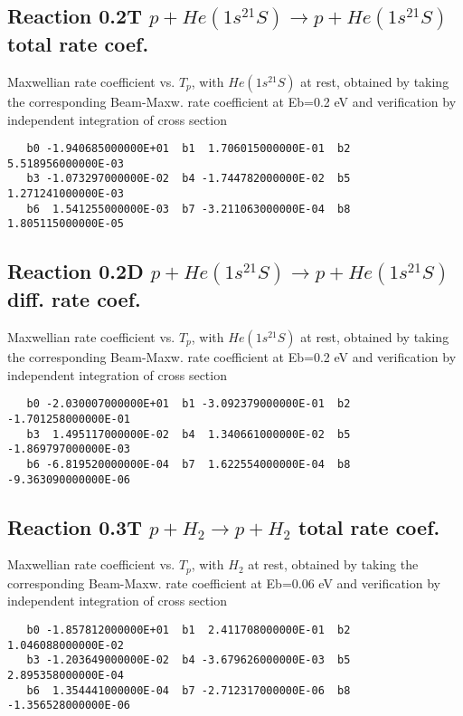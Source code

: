 \documentclass[12pt,dvipdfmx]{article}
\begin{document}
\subsection{
Reaction 0.2T  $p + He(1s^21S) \rightarrow p + He(1s^21S)$ total rate coef.
}
Maxwellian rate coefficient vs. $T_p$, with $He(1s^21S)$ at rest, obtained by taking
the corresponding Beam-Maxw. rate coefficient at Eb=0.2 eV and
verification by independent integration of cross section
\begin{small}\begin{verbatim}
   b0 -1.940685000000E+01  b1  1.706015000000E-01  b2  5.518956000000E-03
   b3 -1.073297000000E-02  b4 -1.744782000000E-02  b5  1.271241000000E-03
   b6  1.541255000000E-03  b7 -3.211063000000E-04  b8  1.805115000000E-05
\end{verbatim}\end{small}


\subsection{
Reaction 0.2D  $p + He(1s^21S) \rightarrow p + He(1s^21S)$ diff. rate coef.
}
Maxwellian rate coefficient vs. $T_p$, with $He(1s^21S)$ at rest, obtained by taking
the corresponding Beam-Maxw. rate coefficient at Eb=0.2 eV and
verification by independent integration of cross section
\begin{small}\begin{verbatim}
   b0 -2.030007000000E+01  b1 -3.092379000000E-01  b2 -1.701258000000E-01
   b3  1.495117000000E-02  b4  1.340661000000E-02  b5 -1.869797000000E-03
   b6 -6.819520000000E-04  b7  1.622554000000E-04  b8 -9.363090000000E-06
\end{verbatim}\end{small}


\subsection{
Reaction 0.3T  $p + H_2 \rightarrow p + H_2$ total rate coef.
}
Maxwellian rate coefficient vs. $T_p$, with $H_2$ at rest, obtained by taking
the corresponding Beam-Maxw. rate coefficient at Eb=0.06 eV and
verification by independent integration of cross section
\begin{small}\begin{verbatim}
   b0 -1.857812000000E+01  b1  2.411708000000E-01  b2  1.046088000000E-02
   b3 -1.203649000000E-02  b4 -3.679626000000E-03  b5  2.895358000000E-04
   b6  1.354441000000E-04  b7 -2.712317000000E-06  b8 -1.356528000000E-06
\end{verbatim}\end{small}
\end{document}
